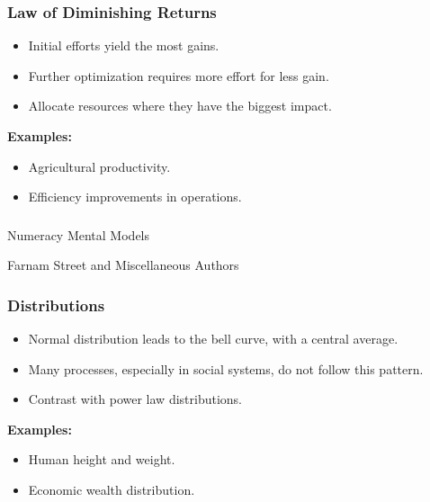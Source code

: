 \begin{frame}[fragile]\frametitle{Law of Diminishing Returns}
\begin{itemize}
    \item Initial efforts yield the most gains.
    \item Further optimization requires more effort for less gain.
    \item Allocate resources where they have the biggest impact.
\end{itemize}
\textbf{Examples:}
\begin{itemize}
    \item Agricultural productivity.
    \item Efficiency improvements in operations.
\end{itemize}
\end{frame}

\begin{frame}[fragile]\frametitle{}
\begin{center}
{\Large Numeracy Mental Models}

{\tiny Farnam Street and Miscellaneous Authors }


\end{center}
\end{frame}

\begin{frame}[fragile]\frametitle{Distributions}
\begin{itemize}
    \item Normal distribution leads to the bell curve, with a central average.
    \item Many processes, especially in social systems, do not follow this pattern.
    \item Contrast with power law distributions.
\end{itemize}
\textbf{Examples:}
\begin{itemize}
    \item Human height and weight.
    \item Economic wealth distribution.
\end{itemize}
\end{frame}

